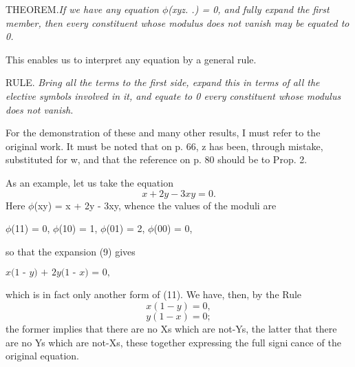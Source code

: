 \documentclass{article}
\begin{document}
{{{\hspace{.2in}
    THEOREM.\textit{If we have any equation $\phi$(xyz. .) = 0, and fully expand the first
member, then every constituent whose modulus does not vanish may be equated
to 0.}\vspace{.05in}

\hspace{.2in}
    This enables us to interpret any equation by a general rule.\vspace{.05in}

\hspace{.2in}
    RULE.\textit{ Bring all the terms to the first side, expand this in terms of all the
elective symbols involved in it, and equate to 0 every constituent whose modulus
does not vanish.}\vspace{.05in}

\hspace{.2in}
    For the demonstration of these and many other results, I must refer to the
original work. It must be noted that on p. 66, z has been, through mistake,
substituted for w, and that the reference on p. 80 should be to Prop. 2.\vspace{.05in}

\hspace{.2in}
    As an example, let us take the equation
                                 \begin{equation}x + 2y - 3xy = 0.\end{equation}                          
Here $\phi$(xy) = x + 2y - 3xy, whence the values of the moduli are\vspace{.05in}

\hspace{.2in}
                $\phi$(11) = 0,   $\phi$(10) = 1,    $\phi$(01) = 2,   $\phi$(00) = 0,\vspace{.1in}

so that the expansion (9) gives

  \begin{center}$\textit{x(1 - y) + 2y(1 - x) = 0,}$\end{center}\vspace{.1in}
which is in fact only another form of (11). We have, then, by the Rule
\begin{equation}x(1 - y) = 0,\end{equation}
\begin{equation}y(1 - x) = 0; \end{equation}
the former implies that there are no Xs which are not-Ys, the latter that there
are no Ys which are not-Xs, these together expressing the full signicance of
the original equation.\vspace{.05in}

}}}
\end{document}
